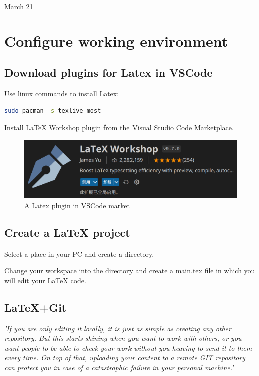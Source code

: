 \univlogo

{\Huge March 21}\vspace{5mm}

\section*{Configure working environment}

\subsection*{Download plugins for Latex in VSCode}

Use linux commands to install Latex:

\begin{lstlisting}[language=bash]
    sudo pacman -s texlive-most
\end{lstlisting}

Install LaTeX Workshop plugin from the Visual Studio Code Marketplace.

\begin{figure}[h]
\centering
\includegraphics[width=1\textwidth]{./2023Mar/LaTeX-Workshop.png}
\caption{A Latex plugin in VSCode market}
\label{latexworkshop}
\end{figure}

\subsection*{Create a LaTeX project}

Select a place in your PC and create a directory.

Change your workspace into the directory and create a main.tex file in which you will edit your LaTeX code.

\subsection*{LaTeX+Git}

\emph{'If you are only editing it locally, it is just as simple as creating any other repository. But this starts shining when you want to work with others, or you want people to be able to check your work without you heaving to send it to them every time. On top of that, uploading your content to a remote GIT repository can protect you in case of a catastrophic failure in your personal machine.'}

